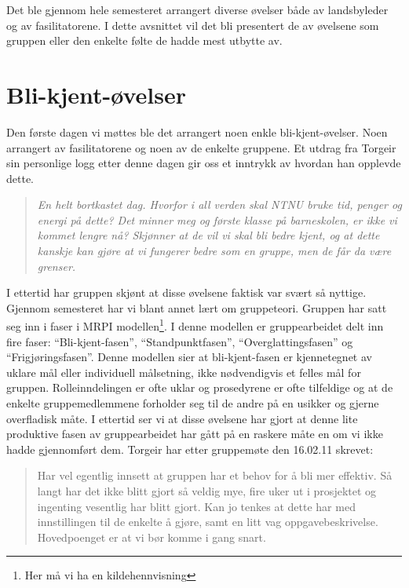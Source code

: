 Det ble gjennom hele semesteret arrangert diverse øvelser både av landsbyleder og av fasilitatorene. 
I dette avsnittet vil det bli presentert de av øvelsene som gruppen eller den enkelte følte de hadde mest utbytte av.

\section{Bli-kjent-øvelser}
Den første dagen vi møttes ble det arrangert noen enkle bli-kjent-øvelser. 
Noen arrangert av fasilitatorene og noen av de enkelte gruppene. 
Et utdrag fra Torgeir sin personlige logg etter denne dagen gir oss et inntrykk av hvordan han opplevde dette.

\begin{quote}
\emph{En helt bortkastet dag. Hvorfor i all verden skal NTNU bruke tid, penger og energi på dette? 
Det minner meg og første klasse på barneskolen, er ikke vi kommet lengre nå? 
Skjønner at de vil vi skal bli bedre kjent, og at dette kanskje kan gjøre at vi fungerer bedre som en gruppe, men de får da være grenser.}
\end{quote}

I ettertid har gruppen skjønt at disse øvelsene faktisk var svært så nyttige. 
Gjennom semesteret har vi blant annet lært om gruppeteori. 
Gruppen har satt seg inn i faser i MRPI modellen\footnote{Her må vi ha en kildehennvisning}.
I denne modellen er gruppearbeidet delt inn fire faser: 
“Bli-kjent-fasen”, “Standpunktfasen”, “Overglattingsfasen” og “Frigjøringsfasen”. 
Denne modellen sier at bli-kjent-fasen er kjennetegnet av uklare mål eller individuell målsetning, 
ikke nødvendigvis et felles mål for gruppen. 
Rolleinndelingen er ofte uklar og prosedyrene er ofte tilfeldige og at de enkelte gruppemedlemmene forholder seg til de andre på en usikker og gjerne overfladisk måte.
I ettertid ser vi at disse øvelsene har gjort at denne lite produktive fasen av gruppearbeidet har gått på en raskere måte en om vi ikke hadde gjennomført dem. 
Torgeir har etter gruppemøte den 16.02.11 skrevet:

\begin{quote}
Har vel egentlig innsett at gruppen har et behov for å bli mer effektiv. 
Så langt har det ikke blitt gjort så veldig mye, fire uker ut i prosjektet og ingenting vesentlig har blitt gjort. 
Kan jo tenkes at dette har med innstillingen til de enkelte å gjøre, samt en litt vag oppgavebeskrivelse. 
Hovedpoenget er at vi bør komme i gang snart. 
\end{quote}

